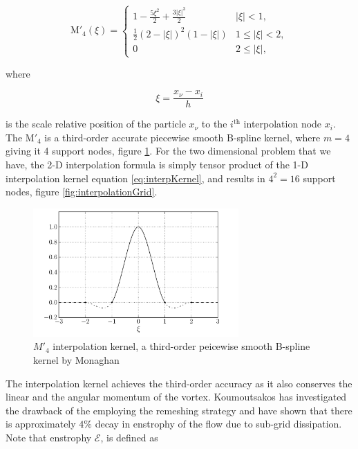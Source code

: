 	\begin{equation}
	{\mathrm{M'}_4}\left( {\xi} \right) =
	  \begin{cases}
	   {1 - \frac{{5{\xi ^2}}}{2} + \frac{{3{{\left| \xi  \right|}^3}}}{2}} & {\left| \xi \right|} < 1, \\
	   \frac{1}{2}{\left( {2 - \left| \xi  \right|} \right)^2}\left( {1 - \left| \xi  \right|} \right) & 1 \le {\left| \xi \right|} < 2,\\
	   0 & 2 \le \left| \xi \right|,
	  \end{cases}
	\label{eq:interpKernel}
	\end{equation}

where 

	\begin{equation}
	\xi = \frac{x_{\nu} - x_i}{h}
	\label{eq:xiEquation}
	\end{equation}

is the scale relative position of the particle $x_{\nu}$ to the $i^{\mathrm{th}}$ interpolation node $x_i$. The $\mathrm{M'}_4$ is a third-order accurate piecewise smooth B-spline kernel, where $m = 4$ giving it 4 support nodes, figure \ref{fig:interpolationKernel}. For the two dimensional problem that we have, the 2-D interpolation formula is simply tensor product of the 1-D interpolation kernel equation \ref{eq:interpKernel}, and results in $4^2 = 16$ support nodes, figure \ref{fig:interpolationGrid}.

	\begin{figure}[t]
	\centering
	\includegraphics[width=0.7\textwidth]{figures/lagrangian/interpolationKernel.pdf}
	\caption{$M'_4$ interpolation kernel, a third-order peicewise smooth B-spline kernel by Monaghan \cite{Monaghan1985}}
	\label{fig:interpolationKernel}
	\end{figure}

The interpolation kernel achieves the third-order accuracy as it also conserves the linear and the angular momentum of the vortex. Koumoutsakos \cite{Koumoutsakos1997} has investigated the drawback of the employing the remeshing strategy and have shown that there is approximately $4\%$ decay in enstrophy of the flow due to sub-grid dissipation. Note that enstrophy $ \mathcal{E}$, is defined as

